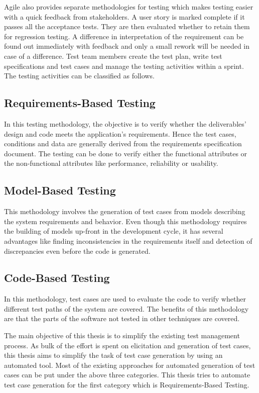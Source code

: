 Agile also provides separate methodologies for testing which makes testing easier with a quick feedback from stakeholders. A user story is marked complete if it passes all the acceptance tests. They are then evaluated whether to retain them for regression testing. A difference in interpretation of the requirement can be found out immediately with feedback and only a small rework will be needed in case of a difference. Test team members create the test plan, write test specifications and test cases and manage the testing activities within a sprint. The testing activities can be classified as follows.

\subsection{Requirements-Based Testing}
In this testing methodology, the objective is to verify whether the deliverables’ design and code meets the application’s requirements. Hence the test cases, conditions and data are generally derived from the requirements specification document. The testing can be done to verify either the functional attributes or the non-functional attributes like performance, reliability or usability. \cite{tahat2001requirement}

\subsection{Model-Based Testing}
This methodology involves the generation of test cases from models describing the system requirements and behavior. Even though this methodology requires the building of models up-front in the development cycle, it has several advantages like finding inconsistencies in the requirements itself and detection of discrepancies even before the code is generated. \cite{dias2007survey}

\subsection{Code-Based Testing}
In this methodology, test cases are used to evaluate the code to verify whether different test paths of the system are covered. The benefits of this methodology are that the parts of the software not tested in other techniques are covered. \cite{prasanna2005survey}

The main objective of this thesis is to simplify the existing test management process. As bulk of the effort is spent on elicitation and generation of test cases, this thesis aims to simplify the task of test case generation by using an automated tool. Most of the existing approaches for automated generation of test cases can be put under the above three categories. This thesis tries to automate test case generation for the first category which is Requirements-Based Testing.


